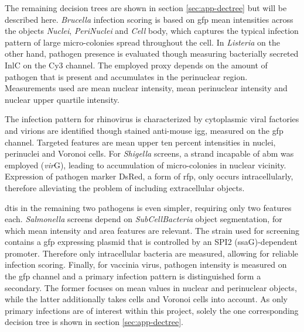 The remaining decision trees are shown in section \ref{sec:app-dectree} but will be described here. \textit{Brucella} infection scoring is based on \gls{gfp} mean intensities across the objects \textit{Nuclei}, \textit{PeriNuclei} and \textit{Cell} body, which captures the typical infection pattern of large micro-colonies spread throughout the cell. In \textit{Listeria} on the other hand, pathogen presence is evaluated though measuring bacterially secreted InlC on the Cy3 channel. The employed proxy depends on the amount of pathogen that is present and accumulates in the perinuclear region. Measurements used are mean nuclear intensity, mean perinuclear intensity and nuclear upper quartile intensity.

The infection pattern for rhinovirus is characterized by cytoplasmic viral factories and virions are identified though stained anti-mouse \gls{igg}, measured on the \gls{gfp} channel. Targeted features are mean upper ten percent intensities in nuclei, perinuclei and Voronoi cells. For \textit{Shigella} screens, a strand incapable of \gls{abm} was employed (\textDelta\textit{vir}G), leading to accumulation of micro-colonies in nuclear vicinity. Expression of pathogen marker DsRed, a form of \gls{rfp}, only occurs intracellularly, therefore alleviating the problem of including extracellular objects.

\Gls{dtis} in the remaining two pathogens is even simpler, requiring only two features each. \textit{Salmonella} screens depend on \textit{SubCellBacteria} object segmentation, for which mean intensity and area features are relevant. The strain used for screening contains a \gls{gfp} expressing plasmid that is controlled by an SPI2 (ssaG)-dependent promoter. Therefore only intracellular bacteria are measured, allowing for reliable infection scoring. Finally, for vaccinia virus, pathogen intensity is measured on the \gls{gfp} channel and a primary infection pattern is distinguished form a secondary. The former focuses on mean values in nuclear and perinuclear objects, while the latter additionally takes cells and Voronoi cells into account. As only primary infections are of interest within this project, solely the one corresponding decision tree is shown in section \ref{sec:app-dectree}.

